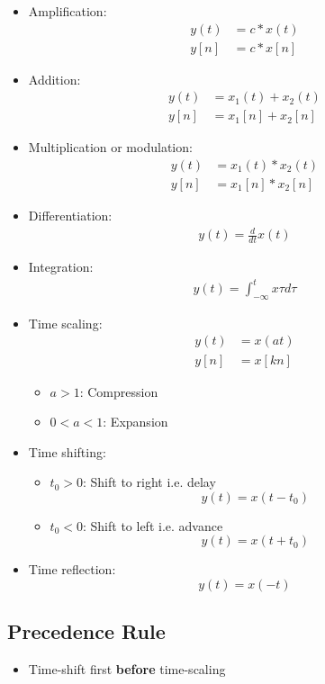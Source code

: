 \documentclass[conference]{IEEEtran}
\begin{document}
\begin{itemize}
  \item Amplification:
  \begin{align*}
    y(t) &= c*x(t) \\
    y[n] &= c*x[n]
  \end{align*}

  \item Addition:
  \begin{align*}
    y(t) &= x_1(t) + x_2(t) \\
    y[n] &= x_1[n] + x_2[n]
  \end{align*}

  \item Multiplication or modulation:
  \begin{align*}
    y(t) &= x_1(t)*x_2(t) \\
    y[n] &= x_1[n]*x_2[n]
  \end{align*}

  \item Differentiation:
  \begin{align*}
    y(t) = \frac{d}{dt}x(t)
  \end{align*}

  \item Integration:
  \begin{align*}
    y(t) = \int_{-\infty}^t x{\tau} d\tau 
  \end{align*}

  \item Time scaling:
  \begin{align*}
    y(t) &= x(at) \\
    y[n] &= x[kn]
  \end{align*}
  \begin{itemize}
    \item $a>1$: Compression
    \item $0<a<1$: Expansion
  \end{itemize}

  \item Time shifting:
  \begin{itemize}
    \item $t_0 > 0$: Shift to right i.e. delay
    $$
    y(t) = x(t - t_0)
    $$
    \item $t_0 < 0$: Shift to left i.e. advance
    $$
    y(t) = x(t + t_0)
    $$
  \end{itemize}

  \item Time reflection:
  $$
    y(t) = x(-t)
  $$
\end{itemize}

\subsection{Precedence Rule}
\begin{itemize}
  \item Time-shift first \textbf{before} time-scaling
\end{itemize}












\end{document}
